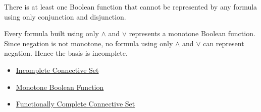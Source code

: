 \begin{remark*}
There is at least one Boolean function that cannot be represented by any formula
using only conjunction and disjunction.
\end{remark*}

\begin{remark*}[Interpretation]
Every formula built using only \(\land\) and \(\lor\) represents a monotone
Boolean function. Since negation is not monotone, no formula using only
\(\land\) and \(\lor\) can represent negation. Hence the basis is incomplete.
\end{remark*}

\begin{dependencies}
\begin{itemize}
  \item \hyperref[def:incomplete-connective-set-propositional-logic]{Incomplete Connective Set}
  \item \hyperref[def:monotone-boolean-function-propositional-logic]{Monotone Boolean Function}
  \item \hyperref[def:functionally-complete-connective-set-propositional-logic]{Functionally Complete Connective Set}
\end{itemize}
\end{dependencies}
